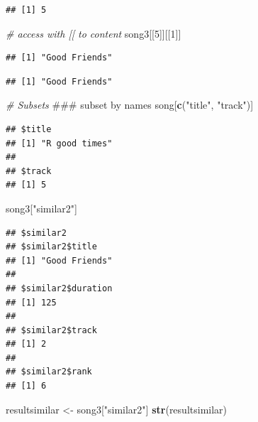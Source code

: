 \documentclass[]{book}
\newenvironment{Shaded}{\begin{snugshade}}{\end{snugshade}}
\newcommand{\KeywordTok}[1]{\textcolor[rgb]{0.13,0.29,0.53}{\textbf{{#1}}}}
\newcommand{\DecValTok}[1]{\textcolor[rgb]{0.00,0.00,0.81}{{#1}}}
\newcommand{\StringTok}[1]{\textcolor[rgb]{0.31,0.60,0.02}{{#1}}}
\newcommand{\CommentTok}[1]{\textcolor[rgb]{0.56,0.35,0.01}{\textit{{#1}}}}
\newcommand{\NormalTok}[1]{{#1}}
\begin{document}
\begin{verbatim}
## [1] 5
\end{verbatim}

\begin{Shaded}
\begin{Highlighting}[]
\CommentTok{# access with [[ to content }
\NormalTok{song3[[}\DecValTok{5}\NormalTok{]][[}\DecValTok{1}\NormalTok{]]}
\end{Highlighting}
\end{Shaded}

\begin{verbatim}
## [1] "Good Friends"
\end{verbatim}

\begin{Shaded}
\end{Shaded}

\begin{verbatim}
## [1] "Good Friends"
\end{verbatim}

\begin{Shaded}
\begin{Highlighting}[]
\CommentTok{# Subsets}
\NormalTok{### subset by names}
\NormalTok{song[}\KeywordTok{c}\NormalTok{(}\StringTok{"title"}\NormalTok{, }\StringTok{"track"}\NormalTok{)]}
\end{Highlighting}
\end{Shaded}

\begin{verbatim}
## $title
## [1] "R good times"
## 
## $track
## [1] 5
\end{verbatim}

\begin{Shaded}
\begin{Highlighting}[]
\NormalTok{song3[}\StringTok{"similar2"}\NormalTok{]}
\end{Highlighting}
\end{Shaded}

\begin{verbatim}
## $similar2
## $similar2$title
## [1] "Good Friends"
## 
## $similar2$duration
## [1] 125
## 
## $similar2$track
## [1] 2
## 
## $similar2$rank
## [1] 6
\end{verbatim}

\begin{Shaded}
\begin{Highlighting}[]
\NormalTok{resultsimilar <-}\StringTok{ }\NormalTok{song3[}\StringTok{"similar2"}\NormalTok{]}
\KeywordTok{str}\NormalTok{(resultsimilar)}
\end{Highlighting}
\end{Shaded}
\end{document}
